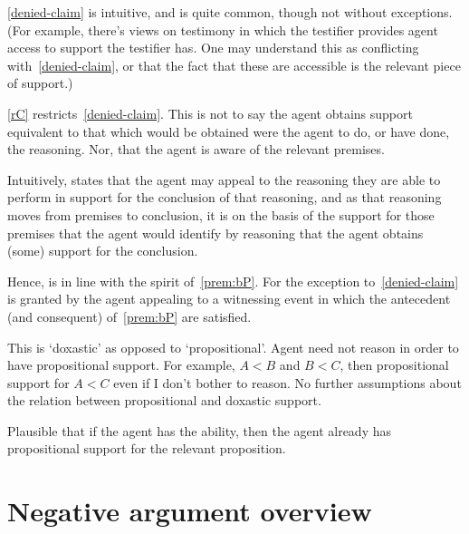 \begin{note}[\mp{} is intuitive]
  \ref{denied-claim} is intuitive, and is quite common, though not without exceptions.
(For example, there's views on testimony in which the testifier provides agent access to support the testifier has.
One may understand this as conflicting with~\ref{denied-claim}, or that the fact that these are accessible is the relevant piece of support.)
\end{note}

\begin{note}[Alternative]
  \ref{rC} restricts~\ref{denied-claim}.
  This is not to say the agent obtains support equivalent to that which would be obtained were the agent to do, or have done, the reasoning.
  Nor, that the agent is aware of the relevant premises.

  Intuitively, \rC{} states that the agent may appeal to the reasoning they are able to perform in support for the conclusion of that reasoning, and as that reasoning moves from premises to conclusion, it is on the basis of the support for those premises that the agent would identify by reasoning that the agent obtains (some) support for the conclusion.

  Hence, \rC{} is in line with the spirit of~\ref{prem:bP}.
  For the exception to~\ref{denied-claim} is granted by the agent appealing to a witnessing event in which the antecedent (and consequent) of~\ref{prem:bP} are satisfied.
\end{note}

\begin{note}
  This is `doxastic' as opposed to `propositional'.
  Agent need not reason in order to have propositional support.
  For example, \(A < B\) and \(B < C\), then propositional support for \(A < C\) even if I don't bother to reason.
  No further assumptions about the relation between propositional and doxastic support.
\end{note}

\begin{note}
  Plausible that if the agent has the ability, then the agent already has propositional support for the relevant proposition.
\end{note}

\section{Negative argument overview}
\label{sec:broad-argum-overv}

